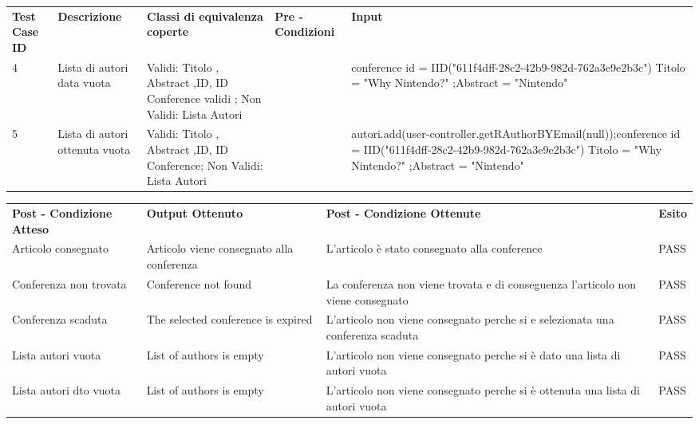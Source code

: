 \begin{tabular}{|p{2.5cm}|p{2.5cm}|p{3cm}|p{1.5cm}|p{4cm}|}
\hline
\rowcolor{SkyBlue}
\multicolumn{5}{l}{\textbf{submitArticles p2}}\\
\hline
\rowcolor{Red}
\textbf{Test Case ID} & \textbf{Descrizione} & \textbf{Classi di equivalenza coperte} & \textbf{Pre - Condizioni} & \textbf{Input} \\
\hline

4&Lista di autori data vuota& Validi: Titolo , Abstract ,ID, ID Conference validi ; Non Validi: Lista Autori  &&conference id = IID("611f4dff-28c2-42b9-982d-762a3e9e2b3c") Titolo = "Why Nintendo?" ;Abstract = "Nintendo"\\
\hline
5&Lista di autori ottenuta vuota& Validi: Titolo , Abstract ,ID, ID Conference; Non Validi: Lista Autori &&autori.add(user-controller.getRAuthorBYEmail(null));conference id = IID("611f4dff-28c2-42b9-982d-762a3e9e2b3c") Titolo = "Why Nintendo?" ;Abstract = "Nintendo"\\
\hline
\end{tabular}


\begin{tabular}{|p{3.5cm}|p{3cm}|p{3cm}|p{1cm}|}
\hline
\rowcolor{SkyBlue}
\multicolumn{4}{l}{\textbf{submitArticles p3}}\\
\hline
\rowcolor{Red}
 \textbf{Post - Condizione Atteso} & \textbf{Output Ottenuto}& \textbf{Post - Condizione Ottenute}& \textbf{Esito}\\
\hline
 Articolo consegnato & Articolo viene consegnato alla conferenza & L'articolo è stato consegnato alla conference& PASS\\ 
\hline
Conferenza non trovata &  Conference not found & La conferenza non viene trovata e di conseguenza l'articolo non viene consegnato&PASS\\
\hline
Conferenza scaduta & The selected conference is expired & L'articolo non viene consegnato perche si e selezionata una conferenza scaduta&PASS\\
\hline
Lista autori vuota&List of authors is empty&L'articolo non viene consegnato perche si è dato una lista di autori vuota&PASS\\
\hline
Lista autori dto vuota&List of authors is empty&L'articolo non viene consegnato perche si è ottenuta una lista di autori vuota &PASS\\
\hline
\end{tabular}


